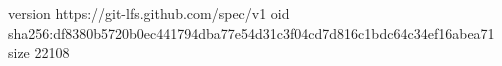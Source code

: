 version https://git-lfs.github.com/spec/v1
oid sha256:df8380b5720b0ec441794dba77e54d31c3f04cd7d816c1bdc64c34ef16abea71
size 22108
